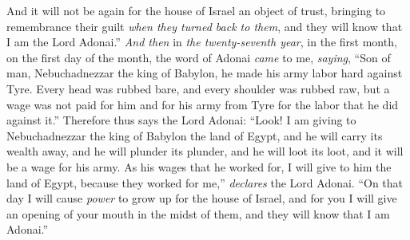 \begin{biblechapter}
\verse And it will not be again for the house of Israel an object of trust, bringing to remembrance their guilt \textit{when they turned back to them}, and they will know that I am the Lord Adonai.”
\verse \textit{And then} in \textit{the twenty-seventh year}, in the first month, on the first day of the month, the word of Adonai \textit{came} to me, \textit{saying},
\verse “Son of man, Nebuchadnezzar the king of Babylon, he made his army labor hard against Tyre. Every head was rubbed bare, and every shoulder was rubbed raw, but a wage was not paid for him and for his army from Tyre for the labor that he did against it.”
\verse Therefore thus says the Lord Adonai: “Look! I am giving to Nebuchadnezzar the king of Babylon the land of Egypt, and he will carry its wealth away, and he will plunder its plunder, and he will loot its loot, and it will be a wage for his army.
\verse As his wages that he worked for, I will give to him the land of Egypt, because they worked for me,” \textit{declares} the Lord Adonai.
\verse “On that day I will cause \textit{power} to grow up for the house of Israel, and for you I will give an opening of your mouth in the midst of them, and they will know that I am Adonai.”
\end{biblechapter}

